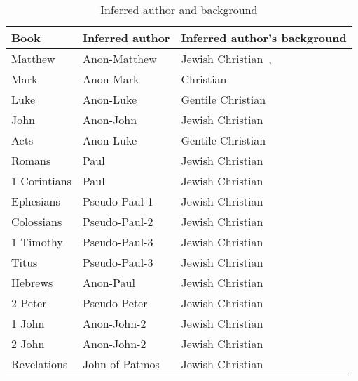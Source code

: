 \documentclass{article}
\begin{document}
\begin{table}
    \centering
    \renewcommand\arraystretch{1.3}
    \begin{tabular}{@{}lll@{}}
    \toprule
        Book & Inferred author & Inferred author's background\\
    \midrule
        Matthew & Anon-Matthew & Jewish Christian~\cite{Duling2010},~\cite{Saldarini2003} \\
        Mark & Anon-Mark & Christian~\cite{Schroter2010} \\
        Luke & Anon-Luke & Gentile Christian \\
        John & Anon-John & Jewish Christian \\
        Acts & Anon-Luke & Gentile Christian \\
        Romans & Paul & Jewish Christian \\
        1 Corintians & Paul & Jewish Christian \\
        Ephesians & Pseudo-Paul-1 & Jewish Christian \\
        Colossians & Pseudo-Paul-2~\cite{Hooker2003} & Jewish Christian \\
        1 Timothy & Pseudo-Paul-3 & Jewish Christian \\
        Titus & Pseudo-Paul-3 & Jewish Christian \\
        Hebrews & Anon-Paul & Jewish Christian \\
        2 Peter & Pseudo-Peter & Jewish Christian \\
        1 John & Anon-John-2 & Jewish Christian \\
        2 John & Anon-John-2 & Jewish Christian \\
        Revelations & John of Patmos & Jewish Christian~\cite{Stuckenbruck2003} \\
    \bottomrule
    \end{tabular}
    \caption{Inferred author and background}
    \label{author}
\end{table}
\end{document}
